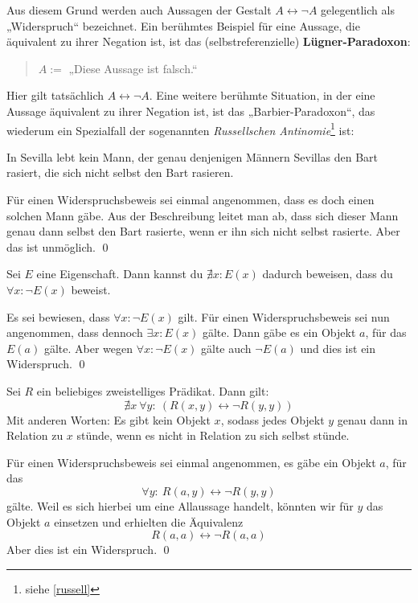 \begin{bem}[*]
  Aus diesem Grund werden auch Aussagen der Gestalt $A\leftrightarrow \neg A$ gelegentlich als „Widerspruch“ bezeichnet. Ein berühmtes Beispiel für eine Aussage, die äquivalent zu ihrer Negation ist, ist das (selbstreferenzielle) \textbf{Lügner-Paradoxon}:
  \begin{quote}
   $A:=$ „Diese Aussage ist falsch.“
  \end{quote}
\end{bem}
Hier gilt tatsächlich $A\leftrightarrow \neg A$. Eine weitere berühmte Situation, in der eine Aussage äquivalent zu ihrer Negation ist, ist das „Barbier-Paradoxon“, das wiederum ein Spezialfall der sogenannten \emph{Russellschen Antinomie}\footnote{siehe \cref{russell}} ist:
\begin{bsp} \label{barbier}
   In Sevilla lebt kein Mann, der genau denjenigen Männern Sevillas den Bart rasiert, die sich nicht selbst den Bart rasieren.
\end{bsp}
  \begin{bew}
Für einen Widerspruchsbeweis sei einmal angenommen, dass es doch einen solchen Mann gäbe. Aus der Beschreibung leitet man ab, dass sich dieser Mann genau dann selbst den Bart rasierte, wenn er ihn sich nicht selbst rasierte. Aber das ist unmöglich. \qed
  \end{bew}
  
  
  


  \begin{sat} \label{existenzwiderleg}
 Sei $E$ eine Eigenschaft. Dann kannst du $\nexists x: E(x)$ dadurch beweisen, dass du $\forall x: \neg E(x)$ beweist.
\end{sat}
\begin{bew}
 Es sei bewiesen, dass $\forall x: \neg E(x)$ gilt. Für einen Widerspruchsbeweis sei nun angenommen, dass dennoch $\exists x: E(x)$ gälte. Dann gäbe es ein Objekt $a$, für das $E(a)$ gälte. Aber wegen $\forall x: \neg E(x)$ gälte auch $\neg E(a)$ und dies ist ein Widerspruch. \qed
\end{bew}



  \begin{sat} \label{russell}
  Sei $R$ ein beliebiges zweistelliges Prädikat. Dann gilt:
  \[ \nexists x\ \forall y:\ (R(x,y) \leftrightarrow \neg R(y,y))\]
  Mit anderen Worten: Es gibt kein Objekt $x$, sodass jedes Objekt $y$ genau dann in Relation zu $x$ stünde, wenn es nicht in Relation zu sich selbst stünde.
 \end{sat}
 \begin{bew}
  Für einen Widerspruchsbeweis sei einmal angenommen, es gäbe ein Objekt $a$, für das
  \[ \forall y:\ R(a,y) \leftrightarrow \neg R(y,y) \]
  gälte. Weil es sich hierbei um eine Allaussage handelt, könnten wir für $y$ das Objekt $a$ einsetzen und erhielten die Äquivalenz
  \[ R(a,a) \leftrightarrow \neg R(a,a) \]
  Aber dies ist ein Widerspruch. \qed
 \end{bew}
 
